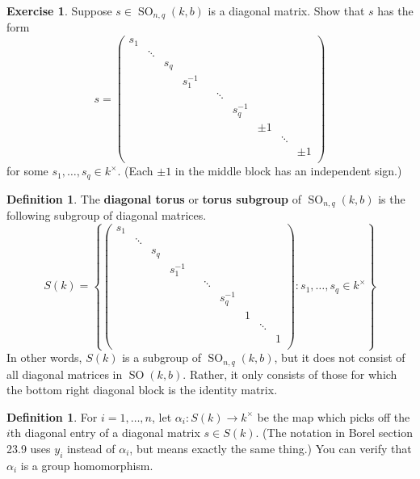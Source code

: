 \documentclass[12pt]{article}
\theoremstyle{definition}
\newtheorem{definition}[theorem]{Definition}
\newtheorem{exercise}[theorem]{Exercise}
\numberwithin{theorem}{subsection}
\newcommand{\lb}{\left\{}
\newcommand{\rb}{\right\}}
\newcommand{\tbf}{\textbf}
\newcommand{\inv}{^{-1}}
\DeclareMathOperator{\SO}{SO}
\begin{document}
\begin{exercise}
Suppose $s \in \SO_{n,q}(k,b)$ is a diagonal matrix. Show that $s$ has the form
\[
	s =
	\begin{pmatrix}
		s_1 \\
		& \ddots \\
		&& s_q \\
		&&& s_1 \inv \\
		&&&&& \ddots \\
		&&&&&& s_q \inv \\
		&&&&&&& \pm 1 \\
		&&&&&&&& \ddots \\
		&&&&&&&&& \pm 1 \\
	\end{pmatrix}
\]
for some $s_1, \ldots, s_q \in k^\times$. (Each $\pm 1$ in the middle block has an independent sign.)
\end{exercise}

\begin{definition}
The \tbf{diagonal torus} or \tbf{torus subgroup} of $\SO_{n,q}(k,b)$ is the following subgroup of diagonal matrices.
\[
	S(k) = \lb
	\begin{pmatrix}
		s_1 \\
		& \ddots \\
		&& s_q \\
		&&& s_1 \inv \\
		&&&&& \ddots \\
		&&&&&& s_q \inv \\
		&&&&&&& 1 \\
		&&&&&&&& \ddots \\
		&&&&&&&&& 1 \\
	\end{pmatrix}
	: s_1, \ldots, s_q \in k^\times \rb
\]
In other words, $S(k)$ is a subgroup of $\SO_{n,q}(k,b)$, but it does not consist of all diagonal matrices in $\SO(k,b)$. Rather, it only consists of those for which the bottom right diagonal block is the identity matrix.
\end{definition}

\begin{definition}
For $i = 1, \ldots, n$, let $\alpha_i:S(k) \to k^\times$ be the map which picks off the $i$th diagonal entry of a diagonal matrix $s \in S(k)$. (The notation in Borel \cite{Borel-LAG} section 23.9 uses $y_i$ instead of $\alpha_i$, but means exactly the same thing.) You can verify that $\alpha_i$ is a group homomorphism.
\end{definition}
\end{document}
